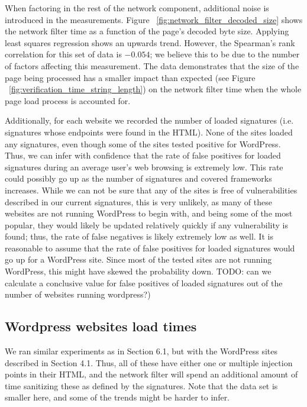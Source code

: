 When factoring in the rest of the network component, additional noise is introduced in the measurements. Figure ~\ref{fig:network_filter_decoded_size} shows the network filter time as a function of the page's decoded byte size. Applying least squares regression shows an upwards trend. However, the Spearman's rank correlation for this set of data is $-0.054$; we believe this to be due to the number of factors affecting this measurement. The data demonstrates that the size of the page being processed has a smaller impact than expected (see Figure ~\ref{fig:verification_time_string_length}) on the network filter time when the whole page load process is accounted for.

Additionally, for each website we recorded the number of loaded signatures (i.e. signatures whose endpoints were found in the HTML). None of the sites loaded any signatures, even though some of the sites tested positive for WordPress. Thus, we can infer with confidence that the rate of false positives for loaded signatures during an average user's web browsing is extremely low. This rate could possibly go up as the number of signatures and covered frameworks increases. While we can not be sure that any of the sites is free of vulnerabilities described in our current signatures, this is very unlikely, as many of these websites are not running WordPress to begin with, and being some of the most popular, they would likely be updated relatively quickly if any vulnerability is found; thus, the rate of false negatives is likely extremely low as well. It is reasonable to assume that the rate of false positives for loaded signatures would go up for a WordPress site. Since most of the tested sites are not running WordPress, this might have skewed the probability down. TODO: can we calculate a conclusive value for false positives of loaded signatures out of the number of websites running wordpress?)

\subsection{Wordpress websites load times}

We ran similar experiments as in Section 6.1, but with the WordPress sites described in Section 4.1. Thus, all of these have either one or multiple injection points in their HTML, and the network filter will spend an additional amount of time sanitizing these as defined by the signatures. Note that the data set is smaller here, and some of the trends might be harder to infer. 

